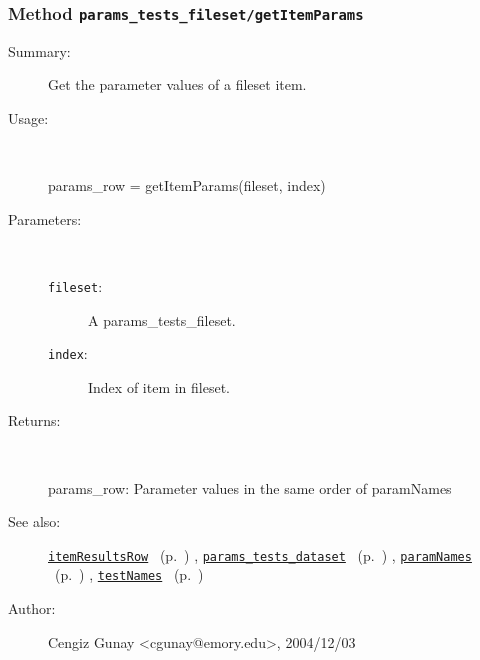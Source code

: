 \subsubsection[Method \texttt{getItemParams}]{Method \texttt{params\_tests\_fileset/getItemParams}}%
%
\label{ref_params_tests_fileset__getItemParams}%
\hypertarget{ref_params_tests_fileset__getItemParams}{}%
\begin{description}
\item[Summary:]Get the parameter values of a fileset item.
%
\item[Usage:]~%
\begin{lyxcode}%
params\_row = getItemParams(fileset, index)
%
\end{lyxcode}%
%
%
\item[Parameters:]~
\begin{description}%
\item[\texttt{fileset}:]
 A params\_tests\_fileset.
\item[\texttt{index}:]
 Index of item in fileset.
\end{description}%
%
\item[Returns:
]~

	params\_row: Parameter values in the same order of paramNames
%
%
\item[See also:]%
\hyperlink{ref_itemResultsRow}{\texttt{itemResultsRow}}%
\ (p.~\pageref{ref_itemResultsRow})%
%
, \hyperlink{ref_params_tests_dataset}{\texttt{params\_tests\_dataset}}%
\ (p.~\pageref{ref_params_tests_dataset})%
%
, \hyperlink{ref_paramNames}{\texttt{paramNames}}%
\ (p.~\pageref{ref_paramNames})%
%
, \hyperlink{ref_testNames}{\texttt{testNames}}%
\ (p.~\pageref{ref_testNames})%
%
%
\item[Author:]%
Cengiz Gunay <cgunay@emory.edu>, 2004/12/03
%
\end{description}
\methodline%
